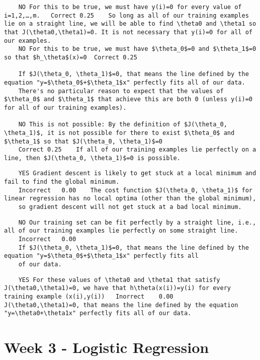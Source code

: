\documentclass[11pt]{article} %
\begin{document}
	\begin{verbatim}
	NO For this to be true, we must have y(i)=0 for every value of i=1,2,…,m.	Correct	0.25	So long as all of our training examples lie on a straight line, we will be able to find \theta0 and \theta1 so that J(\theta0,\theta1)=0. It is not necessary that y(i)=0 for all of our examples.
	NO For this to be true, we must have $\theta_0$=0 and $\theta_1$=0 so that $h_\theta$(x)=0	Correct	0.25	
	
	If $J(\theta_0, \theta_1)$=0, that means the line defined by the equation "y=$\theta_0$+$\theta_1$x" perfectly fits all of our data. 
	There's no particular reason to expect that the values of $\theta_0$ and $\theta_1$ that achieve this are both 0 (unless y(i)=0 for all of our training examples).
	
	NO This is not possible: By the definition of $J(\theta_0, \theta_1)$, it is not possible for there to exist $\theta_0$ and $\theta_1$ so that $J(\theta_0, \theta_1)$=0	
	Correct	0.25	If all of our training examples lie perfectly on a line, then $J(\theta_0, \theta_1)$=0 is possible.
	\end{verbatim}
	
	\begin{verbatim}
	YES Gradient descent is likely to get stuck at a local minimum and fail to find the global minimum.	
	Incorrect	0.00	The cost function $J(\theta_0, \theta_1)$ for linear regression has no local optima (other than the global minimum), 
	so gradient descent will not get stuck at a bad local minimum.
	\end{verbatim}
	
	\begin{verbatim}
	NO Our training set can be fit perfectly by a straight line, i.e., all of our training examples lie perfectly on some straight line.	
	Incorrect	0.00	
	If $J(\theta_0, \theta_1)$=0, that means the line defined by the equation "y=$\theta_0$+$\theta_1$x" perfectly fits all
	of our data.
	\end{verbatim}
	
	\begin{verbatim}
	YES For these values of \theta0 and \theta1 that satisfy J(\theta0,\theta1)=0, we have that h\theta(x(i))=y(i) for every training example (x(i),y(i))	Inorrect	0.00	J(\theta0,\theta1)=0, that means the line defined by the equation "y=\theta0+\theta1x" perfectly fits all of our data.
	\end{verbatim}
	\newpage
	\section{Week 3 - Logistic Regression}
	
\end{document}
